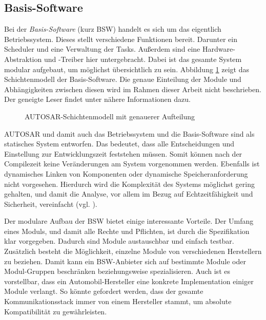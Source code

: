 \documentclass[
  a4paper,					    %
  twoside,
  DIV=calc,     				%
  bibliography=totoc,
  cleardoublepage=empty,
  ngerman,     					%
  final       					%
]{scrbook}
\begin{document}
\subsection{Basis-Software}
\label{sec:bsw}
Bei der \emph{Basis-Software} (kurz BSW) handelt es sich um das eigentlich Betriebssystem. Dieses stellt verschiedene Funktionen bereit. Darunter ein Scheduler und eine Verwaltung der Tasks. Außerdem sind eine Hardware-Abstraktion und -Treiber hier untergebracht. Dabei ist das gesamte System modular aufgebaut, um möglichst übersichtlich zu sein. Abbildung \ref{fig:autosar_refined_layer} zeigt das Schichtenmodell der Basis-Software. Die genaue Einteilung der Module und Abhängigkeiten zwischen diesen wird im Rahmen dieser Arbeit nicht beschrieben. Der geneigte Leser findet unter \cite{autosar_layer} nähere Informationen dazu.

\begin{figure}[tb]
    \centering
    \resizebox{\linewidth}{!}{}
    \caption{AUTOSAR-Schichtenmodell mit genauerer Aufteilung}
    \label{fig:autosar_refined_layer}
\end{figure}

AUTOSAR und damit auch das Betriebssystem und die Basis-Software sind als statisches System entworfen. Das bedeutet, dass alle Entscheidungen und Einstellung zur Entwicklungszeit feststehen müssen. Somit können nach der Compilezeit keine Veränderungen am System vorgenommen werden. Ebenfalls ist dynamisches Linken von Komponenten oder dynamische Speicheranforderung nicht vorgesehen. Hierdurch wird die Komplexität des Systems möglichst gering gehalten, und damit die Analyse, vor allem im Bezug auf Echtzeitfähigkeit und Sicherheit, vereinfacht (vgl. \cite[Seite 186]{SE_Autosar}).

Der modulare Aufbau der BSW bietet einige interessante Vorteile. Der Umfang eines Moduls, und damit alle Rechte und Pflichten, ist durch die Spezifikation klar vorgegeben. Dadurch sind Module austauschbar und einfach testbar. Zusätzlich besteht die Möglichkeit, einzelne Module von verschiedenen Herstellern zu beziehen. Damit kann ein BSW-Anbieter sich auf bestimmte Module oder Modul-Gruppen  beschränken beziehungsweise spezialisieren. Auch ist es vorstellbar, dass ein Automobil-Hersteller eine konkrete Implementation einiger Module verlangt. So könnte gefordert werden, dass der gesamte Kommunikationsstack immer von einem Hersteller stammt, um absolute Kompatibilität zu gewährleisten.
\end{document}
